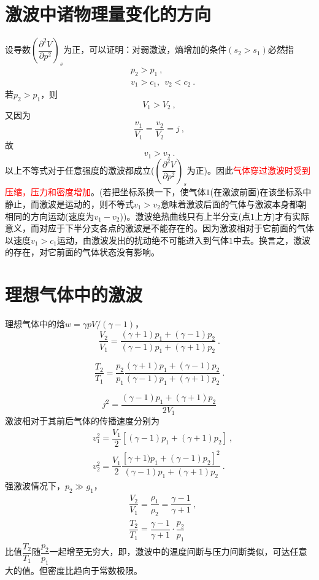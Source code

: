 \documentclass[12pt,a4paper]{article}
\begin{document}
\section{激波中诸物理量变化的方向}
设导数$\left( \dfrac{\partial^2 V}{\partial p^2} \right)_s$为正，可以证明：对弱激波，熵增加的条件$(s_2 > s_1)$必然指
\begin{align}
& p_2 > p_1 ~, \\
& v_1 > c_1, ~~ v_2 < c_2 ~.
\end{align}
若$ p_2 > p_1$，则
\begin{equation}
V_1 > V_2 ~,
\end{equation}
又因为
\begin{equation*}
\dfrac{v_1}{V_1} = \dfrac{v_2}{V_2} = j ~,
\end{equation*}
故
\begin{equation}
v_1 > v_2 ~.
\end{equation}
以上不等式对于任意强度的激波都成立($\left( \dfrac{\partial^2 V}{\partial p^2} \right)_s$为正)。因此\textcolor{red}{气体穿过激波时受到压缩，压力和密度增加}。(若把坐标系换一下，使气体$1$(在激波前面)在该坐标系中静止，而激波是运动的，则不等式$v_1 > v_2$意味着激波后面的气体与激波本身都朝相同的方向运动(速度为$v_1 - v_2$))。激波绝热曲线只有上半分支(点$1$上方)才有实际意义，而对应于下半分支各点的激波是不能存在的。因为激波相对于它前面的气体以速度$v_1 > c_1$运动，由激波发出的扰动绝不可能进入到气体$1$中去。换言之，激波的存在，对它前面的气体状态没有影响。






\section{理想气体中的激波}
理想气体中的焓$w = \gamma pV /(\gamma-1)$，
\begin{equation}
\dfrac{V_2}{V_1} = \dfrac{(\gamma+1)p_1 +(\gamma-1)p_2}{(\gamma-1)p_1 +(\gamma+1)p_2} ~.
\end{equation}

\begin{equation}
\dfrac{T_2}{T_1} = \dfrac{p_2}{p_1} \dfrac{(\gamma+1)p_1 +(\gamma-1)p_2}{(\gamma-1)p_1 +(\gamma+1)p_2} ~.
\end{equation}

\begin{equation}
j^2 = \dfrac{(\gamma-1)p_1 + (\gamma+1)p_2}{2V_1}
\end{equation}
激波相对于其前后气体的传播速度分别为
\begin{align}
& v_1^2 = \dfrac{V_1}{2} [(\gamma-1)p_1 + (\gamma+1)p_2] ~, \\
& v_2^2 = \dfrac{V_1}{2} \dfrac{[\gamma+1)p_1 + (\gamma-1)p_2]^2}{(\gamma-1)p_1 + (\gamma+1)p_2}  ~.
\end{align}
强激波情况下，$p_2 \gg g_1$，
\begin{align}
& \dfrac{V_2}{V_1} = \dfrac{\rho_1}{\rho_2} = \dfrac{\gamma -1}{\gamma +1} ~, \\
& \dfrac{T_2}{T_1} =  \dfrac{\gamma -1}{\gamma +1} \cdot \dfrac{p_2}{p_1}
\end{align}
比值$\dfrac{T_2}{T_1}$随$\dfrac{p_2}{p_1}$一起增至无穷大，即，激波中的温度间断与压力间断类似，可达任意大的值。但密度比趋向于常数极限。
\end{document}
